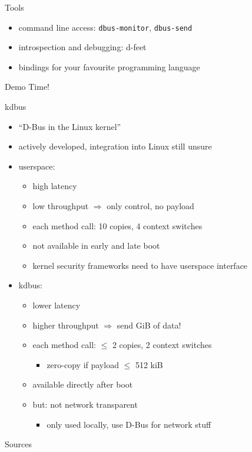\documentclass{beamer}
\begin{document}
\begin{frame}{Tools}
	\begin{itemize}
		\item command line access: \texttt{dbus-monitor}, \texttt{dbus-send}
		\item introspection and debugging: d-feet
		\item bindings for your favourite programming language
	\end{itemize}
	\pause
	\vfill
	\begin{center}
		Demo Time!
	\end{center}
\end{frame}

\begin{frame}{kdbus}
	\begin{itemize}
		\item ``D-Bus in the Linux kernel''
		\item actively developed, integration into Linux still unsure
		\pause
		\item userspace:
			\begin{itemize}
				\item high latency
				\item low throughput $\Rightarrow$ only control, no payload
				\item each method call: 10 copies, 4 context switches
				\item not available in early and late boot
				\item kernel security frameworks need to have userspace interface
			\end{itemize}
		\pause
		\item kdbus:
			\begin{itemize}
				\item lower latency
				\item higher throughput $\Rightarrow$ send GiB of data!
				\item each method call: $\leq$ 2 copies, 2 context switches
					\begin{itemize}
						\item zero-copy if payload $\leq$ 512 kiB
					\end{itemize}
				\item available directly after boot
				\item but: not network transparent
					\begin{itemize}
						\item only used locally, use D-Bus for network stuff
					\end{itemize}
			\end{itemize}
	\end{itemize}
\end{frame}

\begin{frame}{Sources}
\hfill
\begin{thebibliography}{9}
\end{thebibliography}
\end{frame}
\end{document}
